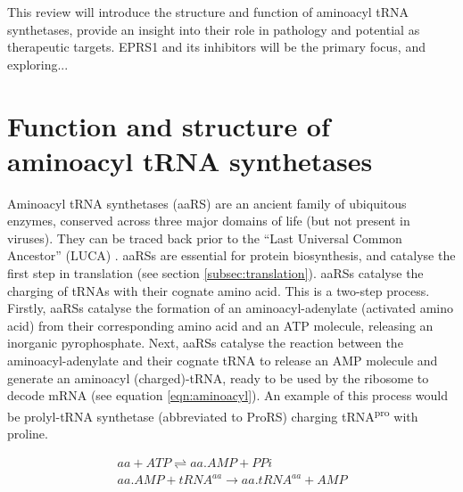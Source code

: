 This review will introduce the structure and function of aminoacyl tRNA synthetases, provide an insight into their role in pathology and potential as therapeutic targets.
EPRS1 and its inhibitors will be the primary focus, and exploring...

\section{Function and structure of aminoacyl tRNA synthetases}

Aminoacyl tRNA synthetases (aaRS) are an ancient family of ubiquitous enzymes, conserved across three major domains of life (but not present in viruses).
They can be traced back prior to the ``Last Universal Common Ancestor'' (LUCA) \cite{de2020evolution}.
aaRSs are essential for protein biosynthesis, and catalyse the first step in translation (see section \ref{subsec:translation}).
aaRSs catalyse the charging of tRNAs with their cognate amino acid.
This is a two-step process.
Firstly, aaRSs catalyse the formation of an aminoacyl-adenylate (activated amino acid) from their corresponding amino acid and an ATP molecule, releasing an inorganic pyrophosphate.
Next, aaRSs catalyse the reaction between the aminoacyl-adenylate and their cognate tRNA to release an AMP molecule and generate an aminoacyl (charged)-tRNA, ready to be used by the ribosome to decode mRNA (see equation \ref{eqn:aminoacyl}).
An example of this process would be prolyl-tRNA synthetase (abbreviated to ProRS) charging tRNA\textsuperscript{pro} with proline.

\begin{equation}\label{eqn:aminoacyl}
\begin{gathered}
aa + ATP \rightleftharpoons  aa.AMP + PPi \\
aa.AMP + tRNA^{aa} \longrightarrow  aa.tRNA^{aa} + AMP
\end{gathered}
\end{equation}

